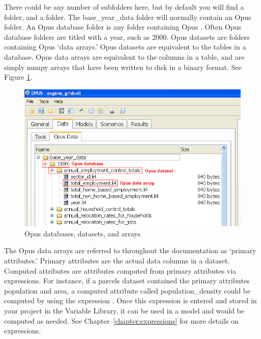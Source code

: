 There could be any number of subfolders here, but by default you will find
a  folder, and a  folder.  The
base_year_data folder will normally contain an Opus  folder.
An Opus database folder is any folder containing Opus .
Often Opus database folders are titled with a year, such as 2000.  Opus
datasets are folders containing Opus `data arrays.'  Opus datasets are
equivalent to the tables in a database.  Opus data arrays are equivalent to
the columns in a table, and are simply numpy arrays that have been written
to disk in a binary format.  See Figure \ref{fig:db-dataset-array}.

\begin{figure}[htp]
\begin{center}
\includegraphics[scale=0.6]{part-gui/images/data-manager-opus-data-tab-db-dataset-array.png}
\end{center}
\caption{Opus databases, datasets, and arrays}
\label{fig:db-dataset-array}
\end{figure}

The Opus data arrays are referred to throughout the documentation as
`primary attributes.'  Primary attributes are the actual data columns in a
dataset.  Computed attributes are attributes computed from primary
attributes via expressions.  For instance, if a parcels dataset contained
the primary attributes population and area, a computed attribute called
population_density could be computed by using the expression
.  Once this expression is
entered and stored in your project in the Variable Library, it can be used
in a model and would be computed as needed.  See Chapter~\ref{chapter:expressions} 
for more details on expressions.

